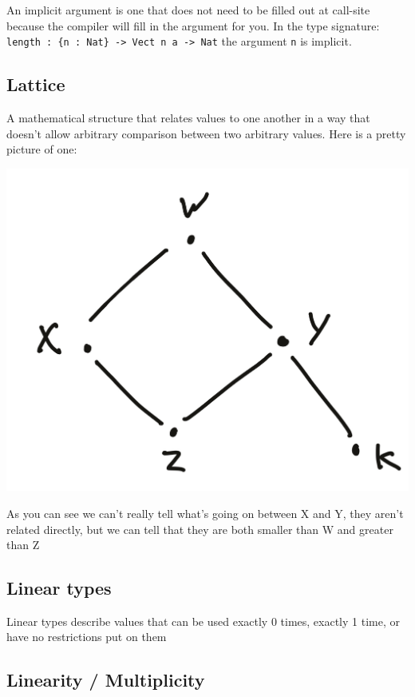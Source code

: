 \documentclass[
]{article}
\begin{document}
An implicit argument is one that does not need to be filled out at
call-site because the compiler will fill in the argument for you. In the
type signature:
\texttt{length\ :\ \{n\ :\ Nat\}\ -\textgreater{}\ Vect\ n\ a\ -\textgreater{}\ Nat}
the argument \texttt{n} is implicit.

\hypertarget{lattice}{%
\subsection{Lattice}\label{lattice}}

A mathematical structure that relates values to one another in a way
that doesn't allow arbitrary comparison between two arbitrary values.
Here is a pretty picture of one:

\includegraphics{lattice.jpg}

As you can see we can't really tell what's going on between X and Y,
they aren't related directly, but we can tell that they are both smaller
than W and greater than Z

\hypertarget{linear-types-1}{%
\subsection{Linear types}\label{linear-types-1}}

Linear types describe values that can be used exactly 0 times, exactly 1
time, or have no restrictions put on them

\hypertarget{linearity-multiplicity}{%
\subsection{Linearity / Multiplicity}\label{linearity-multiplicity}}
\end{document}
